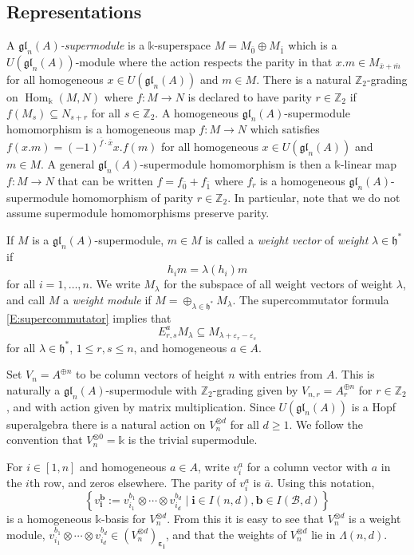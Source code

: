\documentclass[11pt,reqno]{amsart} %
\newcommand{\Z}{\mathbb{Z}}
\newcommand{\gl}{\mathfrak{gl}}
\renewcommand{\k}{\mathds{k}}
\newcommand{\0}{\bar{0}}
\newcommand{\1}{\bar{1}}
\newcommand{\BasisB}{\mathcal{B}}
\newcommand{\parity}[1]{\overline{#1}}
\newcommand{\Hom}{\operatorname{Hom}}
\newcommand{\bi}{\mathbf{i}}
\newcommand{\bb}{\mathbf{b}}
\newcommand{\bepsilon}{\boldsymbol{\varepsilon}}
\newcommand{\fh}{\mathfrak{h}}
\numberwithin{equation}{subsection}
\begin{document}
\subsection{Representations}  A \emph{$\gl_{n}(A)$-supermodule} is a $\k$-superspace $M = M_{\0}\oplus M_{\1}$ which is a $U(\gl_{n}(A))$-module where the action respects the parity in that $x.m \in M_{\parity{x}+\parity{m}}$ for all homogeneous $x \in U(\gl_{n}(A))$ and $m \in M$.  There is a natural $\Z_{2}$-grading on $\Hom_{\k}(M,N)$ where $f : M\to N$ is declared to have parity $r \in \Z_{2}$ if $f(M_{s}) \subseteq N_{s+r}$ for all $s \in \Z_{2}$.  A homogeneous $\gl_{n}(A)$-supermodule homomorphism is a homogeneous map $f: M \to N$ which satisfies $f(x.m) = (-1)^{\parity{f}\cdot\parity{x}}x.f(m)$ for all homogeneous $x \in U(\gl_{n}(A))$ and $m \in M$.  A general $\gl_{n}(A)$-supermodule homomorphism is then a $\k$-linear map $f:M \to N$ that can be written $f = f_{\0} + f_{\1}$ where $f_{r}$ is a homogeneous $\gl_{n}(A)$-supermodule homomorphism of parity $r\in \Z_{2}$.  In particular, note that we do not assume supermodule homomorphisms preserve parity.

If $M$ is a $\gl_{n}(A)$-supermodule, $m \in M$ is called a \emph{weight vector}  of \emph{weight} $\lambda \in \fh^{*}$ if
\[
h_{i}m = \lambda(h_{i})m
\] for all $i=1, \dotsc , n$.  We write $M_{\lambda}$ for the subspace of all weight vectors of weight $\lambda$, and call $M$ a \emph{weight module} if $M = \oplus_{\lambda \in \fh^{*}} M_{\lambda}$.  The supercommutator formula \eqref{E:supercommutator} implies that 
\[
E_{r,s}^{a}M_{\lambda} \subseteq M_{\lambda + \varepsilon_{r}-\varepsilon_{s}}
\] for all $\lambda \in \fh^{*}$, $1 \leq r,s \leq  n$,  and homogeneous $a \in A$.


Set $V_{n}= A^{\oplus n}$ to be column vectors of height $n$ with entries from $A$.  This is naturally a $\gl_{n}(A)$-supermodule with $\Z_{2}$-grading given by $V_{n, r} = A_{r}^{\oplus n}$ for $r \in \Z_{2}$, and with action given by matrix multiplication.  Since  $U(\gl_{n}(A))$ is a Hopf superalgebra there is a natural action on $V_{n}^{\otimes d}$ for all $d \geq 1$.  We follow the convention that $V_{n}^{\otimes 0} = \k$ is the trivial supermodule.

For $i \in [1,n]$ and homogeneous $a \in A$, write $v_{i}^{a}$ for a column vector with $a$ in the $i$th row, and zeros elsewhere. The parity of $v_{i}^{a}$ is $\parity{a}$.  Using this notation, 
\[
\left\{v_{\bi}^{\bb} := v_{i_{1}}^{b_{1}}\otimes \dotsb \otimes v_{i_{d}}^{b_{d}} \mid \bi \in I(n,d),  \bb \in I(\BasisB,d)  \right\}
\] is a homogeneous $\k$-basis for $V_{n}^{\otimes d}$.  From this it is easy to see that $V_{n}^{\otimes d}$ is a weight module, $v_{i_{1}}^{b_{1}}\otimes \dotsb \otimes v_{i_{d}}^{b_{d}} \in \left(V_{n}^{\otimes d} \right)_{\bepsilon_{\bi}}$, and that the weights of $V_{n}^{\otimes d}$ lie in $\Lambda(n,d)$.
\end{document}
